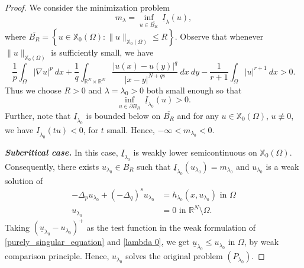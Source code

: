 \documentclass[reqno,oneside]{amsart}
\theoremstyle{definition}
\theoremstyle{remark}
\numberwithin{equation}{section}
\newcommand{\Om} {\Omega}
\newcommand{\sr}{\mathbb{R}}
\newcommand{\p}{\Delta_p}
\newcommand{\qs}{(-\Delta_q)^s}
\newcommand{\bdry}{\mathbb{R}^N \setminus \Omega}
\newcommand{\pa}{\partial}
\newcommand{\na} {\nabla}
\newcommand{\xo}{\mathbb{X}_0}
\newcommand{\la} {\lambda}
\begin{document}
\begin{proof}
    We consider the minimization problem
    \[m_{\la} = \inf_{u\in \overline{B_R}}\ \underline{I}_{\la} (u),\]
    where $\overline{B_R} = \left\{u\in \xo(\Om): \|u\|_{\xo (\Om)} \leq R \right\}$. Observe that whenever $\|u\|_{\xo (\Om)}$ is sufficiently small, we have
    \begin{equation}\label{positive_for_small_norm}
        \frac{1}{p} \int_{\Om} |\na u|^p\ dx + \frac{1}{q} \int_{\sr^N \times \sr^N} \frac{\left|u(x)- u(y) \right|^q}{|x-y|^{N+qs}}\ dx\ dy - \frac{1}{r+1} \int_{\Om} |u|^{r+1}\ dx >0.
    \end{equation}
    Thus we choose $R>0$ and $\la = \la_0 >0$ both small enough so that
    \begin{equation}\label{positive_on_bdry}
        \inf_{u\in \pa B_R}\ \underline{I}_{\la_0} (u) >0.
    \end{equation}
    Further, note that $\underline{I}_{\la_0}$ is bounded below on $\overline{B_R}$ and for any $u\in \xo (\Om)$, $u\not\equiv 0$, we have $\underline{I}_{\la_0} (tu) < 0$, for $t$ small. Hence, $-\infty < m_{\la_0}<0$.
    \vspace{5pt}

    \noindent\textbf{\textit{Subcritical case.}} In this case, $\underline{I}_{\la_0}$ is weakly lower semicontinuous on $\xo (\Om)$. Consequently, there exists $u_{\la_0} \in B_R$ such that $\underline{I}_{\la_0} (u_{\la_0}) = m_{\la_0}$ and $u_{\la_0}$ is a weak solution of
    \begin{equation}\label{lambda 0}
        \begin{aligned}
            -\p u_{\la_0} + \qs u_{\la_0} &= h_{\la_0} (x, u_{\la_0}) \text{ in } \Om\\
            u_{\la_0} &= 0 \text{ in } \bdry.
        \end{aligned}
    \end{equation}
    Taking $\left(\underline{u}_{\la_0} - u_{\la_0} \right)^+$ as the test function in the weak formulation of \eqref{purely_singular_equation} and \eqref{lambda 0}, we get $\underline{u}_{\la_0} \leq u_{\la_0}$ in $\Om$, by weak comparison principle. Hence, $u_{\la_0}$ solves the original problem $(P_{\la_0})$.
    \vspace{5pt}


\end{proof}
\end{document}
